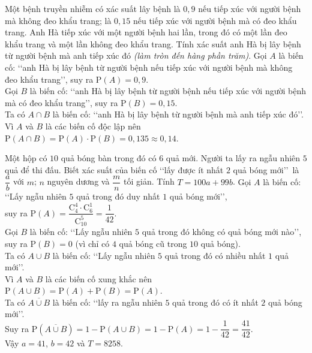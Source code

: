 \begin{ex}%
Một bệnh truyền nhiễm có xác suất lây bệnh là $0{,}9$ nếu tiếp xúc với người bệnh mà không đeo khẩu trang; là $0{,}15$ nếu tiếp xúc với người bệnh mà có đeo khẩu trang. Anh Hà tiếp xúc với một người bệnh hai lần, trong đó có một lần đeo khẩu trang và một lần không đeo khẩu trang. Tính xác suất anh Hà bị lây bệnh từ người bệnh mà anh tiếp xúc đó \textit{(làm tròn đến hàng phần trăm)}.
\loigiai
{
Gọi $A$ là biến cố: \lq\lq anh Hà bị lây bệnh từ người bệnh nếu tiếp xúc với người bệnh mà không đeo khẩu trang\rq\rq, suy ra $\mathrm{P}(A)=0{,}9$.\\
Gọi $B$ là biến cố: \lq\lq anh Hà bị lây bệnh từ người bệnh nếu tiếp xúc với người bệnh mà có đeo khẩu trang\rq\rq, suy ra $\mathrm{P}(B)=0{,}15$.\\
Ta có $A\cap B$ là biến cố: \lq\lq anh Hà bị lây bệnh từ người bệnh mà anh tiếp xúc đó\rq\rq. \\
Vì $A$ và $B$ là các biến cố độc lập nên $\mathrm{P}(A\cap B)=\mathrm{P}(A)\cdot\mathrm{P}(B)=0{,}135\approx0{,}14$.
}
\end{ex}

\begin{ex}%
Một hộp có $10$ quả bóng bàn trong đó có $6$ quả mới. Người ta lấy ra ngẫu nhiên $5$ quả để thi đấu. Biết xác suất của biến cố \lq\lq lấy được ít nhất $2$ quả bóng mới\rq\rq\ là $\dfrac{a}{b}$ với $m$; $n$ nguyên dương và $\dfrac{m}{n}$ tối giản. Tính $T=100a+99b$.
\loigiai
{
Gọi $A$ là biến cố: \lq\lq Lấy ngẫu nhiên $5$ quả trong đó duy nhất $1$ quả bóng mới\rq\rq, \\
suy ra $\mathrm{P}(A)=\dfrac{\mathrm{C}_{4}^{4}\cdot\mathrm{C}_{6}^{1}}{\mathrm{C}_{10}^{5}}=\dfrac{1}{42}$.\\
Gọi $B$ là biến cố: \lq\lq Lấy ngẫu nhiên $5$ quả trong đó không có quả bóng mới nào\rq\rq, \\
suy ra $\mathrm{P}(B)=0$ (vì chỉ có $4$ quả bóng cũ trong $10$ quả bóng).\\
Ta có $A\cup B$ là biến cố: \lq\lq Lấy ngẫu nhiên $5$ quả trong đó có nhiều nhất $1$ quả mới\rq\rq. \\
Vì $A$ và $B$ là các biến cố xung khắc nên $\mathrm{P}(A\cup B)=\mathrm{P}(A)+\mathrm{P}(B)=\mathrm{P}(A)$.\\
Ta có $\overline{A\cup B}$ là biến cố: \lq\lq lấy ra ngẫu nhiên $5$ quả trong đó có ít nhất $2$ quả bóng mới\rq\rq.\\
Suy ra $\mathrm{P}\left(\overline{A\cup B}\right)=1-\mathrm{P}(A\cup B)=1-\mathrm{P}(A)=1-\dfrac{1}{42}=\dfrac{41}{42}$. \\
Vậy $a=41$, $b=42$ và $T=8258$.
}
\end{ex}

